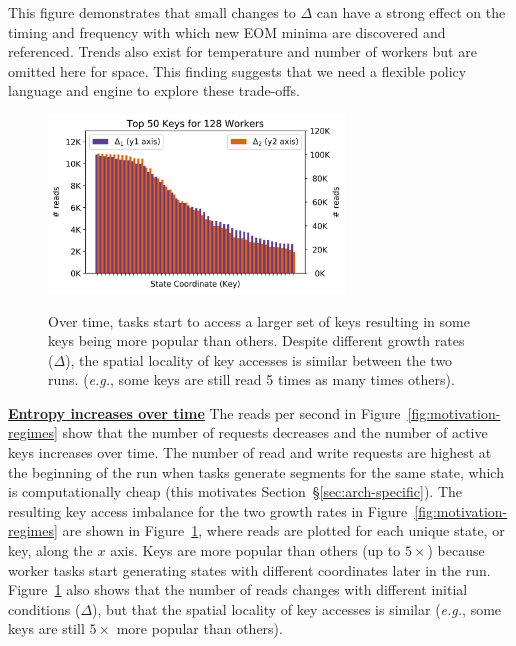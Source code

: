 This figure demonstrates that small changes to \(\Delta\) can have a strong
effect on the timing and frequency with which new EOM minima are discovered and
referenced.  Trends also exist for temperature and number of workers but are
omitted here for space.  This finding suggests that we need a flexible policy
language and engine to explore these trade-offs.  

\begin{figure}[t]
  \centering
  \includegraphics[width=0.7\textwidth]{./chapters/controlplane/parsplice/figures/methodology-keys.png}\\
  \caption{Over time, tasks start to access a larger set of keys resulting in
some keys being more popular than others.  Despite different growth rates
(\(\Delta\)), the spatial locality of key accesses is similar between the two
runs.  ({\it e.g.}, some keys are still read 5 times as many times others).
\label{fig:methodology-keys}}
\end{figure}

\textbf{\underline{Entropy increases over time}} The reads per second in
Figure~\ref{fig:motivation-regimes} show that the number of requests decreases
and the number of active keys increases over time.  The number of read and
write requests are highest at the beginning of the run when tasks generate
segments for the same state, which is computationally cheap (this motivates
Section~\S\ref{sec:arch-specific}).  The resulting key access imbalance for the
two growth rates in Figure~\ref{fig:motivation-regimes} are shown in
Figure~\ref{fig:methodology-keys}, where reads are plotted for each unique
state, or key, along the \(x\) axis. Keys are more popular than others (up to
\(5\times\)) because worker tasks start generating states with different
coordinates later in the run.  Figure~\ref{fig:methodology-keys} also shows that the
number of reads changes with different initial conditions (\(\Delta\)), but
that the spatial locality of key accesses is similar ({\it e.g.}, some keys are
still \(5\times\) more popular than others).
